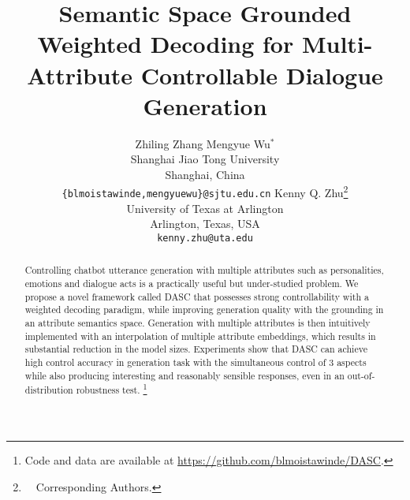 \documentclass[11pt]{article}
\title{Semantic Space Grounded Weighted Decoding for Multi-Attribute 
Controllable Dialogue Generation}
\author{Zhiling Zhang \hspace{5mm} Mengyue Wu$^*$\\
Shanghai Jiao Tong University \\
Shanghai, China\\
\texttt{\{blmoistawinde,mengyuewu\}@sjtu.edu.cn}
\And
Kenny Q. Zhu\thanks{~~Corresponding Authors.}\\
University of Texas at Arlington\\
Arlington, Texas, USA\\
\texttt{kenny.zhu@uta.edu}}
\begin{document}
\maketitle
\begin{abstract}
Controlling chatbot utterance generation with multiple attributes such as 
personalities, emotions and dialogue acts is a practically useful but 
under-studied problem.
We propose a novel framework called DASC 
that possesses strong controllability with a weighted decoding paradigm, 
while improving generation quality with the grounding in an 
attribute semantics space. Generation with multiple attributes is then 
intuitively implemented with an interpolation of multiple attribute embeddings,
which results in substantial reduction in the model sizes. 
Experiments show that DASC can achieve high control accuracy 
in generation task with the simultaneous control of 3 aspects while also producing interesting and 
reasonably sensible responses, even in an out-of-distribution robustness 
test. 
\footnote{Code and data are available at \url{https://github.com/blmoistawinde/DASC}.}
\end{abstract}








% 





\end{document}
